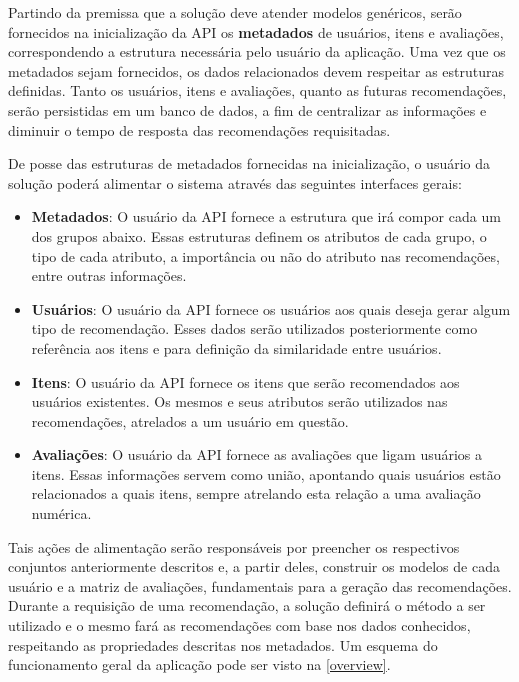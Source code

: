 \documentclass[12pt, openright, oneside, a4paper, brazil]{abntex2}
\begin{document}
Partindo da premissa que a solução deve atender modelos genéricos, serão fornecidos na inicialização da API os \textbf{metadados} de usuários, itens e avaliações, correspondendo a estrutura necessária pelo usuário da aplicação. Uma vez que os metadados sejam fornecidos, os dados relacionados devem respeitar as estruturas definidas. Tanto os usuários, itens e avaliações, quanto as futuras recomendações, serão persistidas em um banco de dados, a fim de centralizar as informações e diminuir o tempo de resposta das recomendações requisitadas.

De posse das estruturas de metadados fornecidas na inicialização, o usuário da solução poderá alimentar o sistema através das seguintes interfaces gerais:

\begin{itemize}
	\item \textbf{Metadados}: O usuário da API fornece a estrutura que irá compor cada um dos grupos abaixo. Essas estruturas definem os atributos de cada grupo, o tipo de cada atributo, a importância ou não do atributo nas recomendações, entre outras informações.

	\item \textbf{Usuários}: O usuário da API fornece os usuários aos quais deseja gerar algum tipo de recomendação. Esses dados serão utilizados posteriormente como referência aos itens e para definição da similaridade entre usuários.

	\item \textbf{Itens}: O usuário da API fornece os itens que serão recomendados aos usuários existentes. Os mesmos e seus atributos serão utilizados nas recomendações, atrelados a um usuário em questão.

	\item \textbf{Avaliações}: O usuário da API fornece as avaliações que ligam usuários a itens. Essas informações servem como união, apontando quais usuários estão relacionados a quais itens, sempre atrelando esta relação a uma avaliação numérica.
\end{itemize}

Tais ações de alimentação serão responsáveis por preencher os respectivos conjuntos anteriormente descritos e, a partir deles, construir os modelos de cada usuário e a matriz de avaliações, fundamentais para a geração das recomendações. Durante a requisição de uma recomendação, a solução definirá o método a ser utilizado e o mesmo fará as recomendações com base nos dados conhecidos, respeitando as propriedades descritas nos metadados. Um esquema do funcionamento geral da aplicação pode ser visto na \autoref{overview}.
\end{document}
